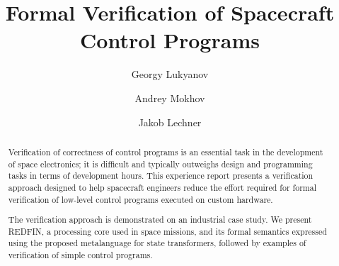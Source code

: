 \documentclass[acmsmall,screen]{acmart}
\begin{document}
\title{Formal Verification of Spacecraft Control Programs}

\author{Georgy Lukyanov}
\author{Andrey Mokhov}
\author{Jakob Lechner}


\begin{abstract}
Verification of correctness of control programs is an essential task
in the development of space electronics; it is difficult and typically
outweighs design and programming tasks in terms of development hours.
This experience report presents a verification approach designed to help
spacecraft engineers reduce the effort required for formal verification of
low-level control programs executed on custom hardware.


The verification approach is demonstrated on an industrial case study.
We present REDFIN, a processing core used in space missions, and its formal
semantics expressed using the proposed metalanguage for state transformers,
followed by examples of verification of simple control programs.

\end{abstract}

\keywords{}

\maketitle









\begin{acks}
\end{acks}

\newpage

\end{document}
